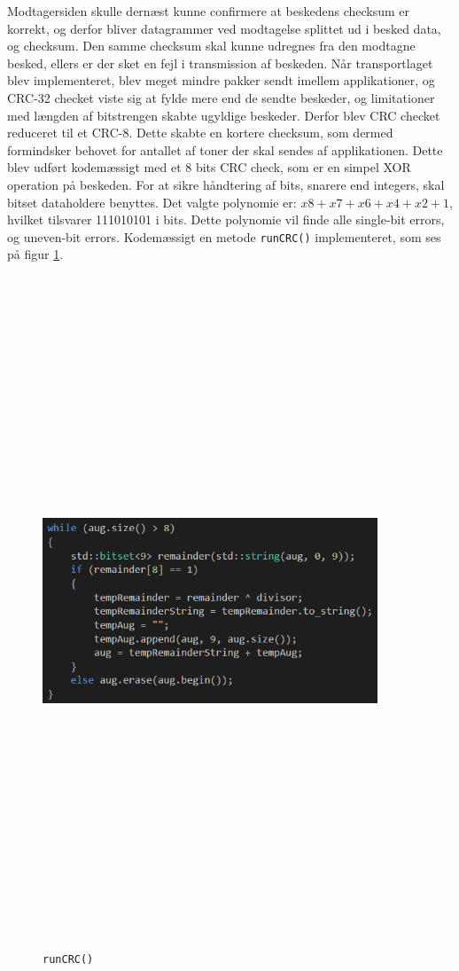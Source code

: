 Modtagersiden skulle dernæst kunne confirmere at beskedens checksum er korrekt, og derfor bliver datagrammer ved modtagelse splittet ud i besked data, og checksum. Den samme checksum skal kunne udregnes fra den modtagne besked, ellers er der sket en fejl i transmission af beskeden.
\newline
Når transportlaget blev implementeret, blev meget mindre pakker sendt imellem applikationer, og CRC-32 checket viste sig at fylde mere end de sendte beskeder, og limitationer med længden af bitstrengen skabte ugyldige beskeder. Derfor blev CRC checket reduceret til et CRC-8. Dette skabte en kortere checksum, som dermed formindsker behovet for antallet af toner der skal sendes af applikationen.
\newline
Dette blev udført kodemæssigt med et 8 bits CRC check, som er en simpel XOR operation på beskeden. For at sikre håndtering af bits, snarere end integers, skal bitset dataholdere benyttes.
\newline
Det valgte polynomie er: $x8 + x7 + x6 + x4 + x2 + 1$, hvilket tilsvarer 111010101 i bits. Dette polynomie vil finde alle single-bit errors, og uneven-bit errors.
Kodemæssigt en metode \texttt{runCRC()} implementeret, som ses på figur \ref{fig:crc}.
\begin{figure}[ht]
	\centering
	\includegraphics[width=10cm,height=20cm,keepaspectratio]{pictures/CRC.png}
	\caption{\texttt{runCRC()}}
	\label{fig:crc}
\end{figure}
